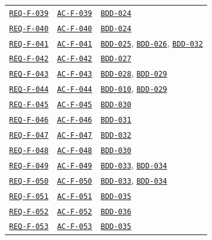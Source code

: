 \documentclass[11pt,a4paper]{article}
\begin{document}
\begin{longtable}{p{3.1cm} p{3.0cm} >{\raggedright\arraybackslash}p{9.1cm}}
\hyperlink{REQ-F-039}{\texttt{REQ-F-039}} & \hyperlink{AC-F-039}{\texttt{AC-F-039}} & \hyperlink{BDD-024}{\texttt{BDD-024}} \\
\hyperlink{REQ-F-040}{\texttt{REQ-F-040}} & \hyperlink{AC-F-040}{\texttt{AC-F-040}} & \hyperlink{BDD-024}{\texttt{BDD-024}} \\
\hyperlink{REQ-F-041}{\texttt{REQ-F-041}} & \hyperlink{AC-F-041}{\texttt{AC-F-041}} & \hyperlink{BDD-025}{\texttt{BDD-025}}, \hyperlink{BDD-026}{\texttt{BDD-026}}, \hyperlink{BDD-032}{\texttt{BDD-032}} \\
\hyperlink{REQ-F-042}{\texttt{REQ-F-042}} & \hyperlink{AC-F-042}{\texttt{AC-F-042}} & \hyperlink{BDD-027}{\texttt{BDD-027}} \\
\hyperlink{REQ-F-043}{\texttt{REQ-F-043}} & \hyperlink{AC-F-043}{\texttt{AC-F-043}} & \hyperlink{BDD-028}{\texttt{BDD-028}}, \hyperlink{BDD-029}{\texttt{BDD-029}} \\
\hyperlink{REQ-F-044}{\texttt{REQ-F-044}} & \hyperlink{AC-F-044}{\texttt{AC-F-044}} & \hyperlink{BDD-010}{\texttt{BDD-010}}, \hyperlink{BDD-029}{\texttt{BDD-029}} \\
\hyperlink{REQ-F-045}{\texttt{REQ-F-045}} & \hyperlink{AC-F-045}{\texttt{AC-F-045}} & \hyperlink{BDD-030}{\texttt{BDD-030}} \\
\hyperlink{REQ-F-046}{\texttt{REQ-F-046}} & \hyperlink{AC-F-046}{\texttt{AC-F-046}} & \hyperlink{BDD-031}{\texttt{BDD-031}} \\
\hyperlink{REQ-F-047}{\texttt{REQ-F-047}} & \hyperlink{AC-F-047}{\texttt{AC-F-047}} & \hyperlink{BDD-032}{\texttt{BDD-032}} \\
\hyperlink{REQ-F-048}{\texttt{REQ-F-048}} & \hyperlink{AC-F-048}{\texttt{AC-F-048}} & \hyperlink{BDD-030}{\texttt{BDD-030}} \\
\hyperlink{REQ-F-049}{\texttt{REQ-F-049}} & \hyperlink{AC-F-049}{\texttt{AC-F-049}} & \hyperlink{BDD-033}{\texttt{BDD-033}}, \hyperlink{BDD-034}{\texttt{BDD-034}} \\
\hyperlink{REQ-F-050}{\texttt{REQ-F-050}} & \hyperlink{AC-F-050}{\texttt{AC-F-050}} & \hyperlink{BDD-033}{\texttt{BDD-033}}, \hyperlink{BDD-034}{\texttt{BDD-034}} \\
\hyperlink{REQ-F-051}{\texttt{REQ-F-051}} & \hyperlink{AC-F-051}{\texttt{AC-F-051}} & \hyperlink{BDD-035}{\texttt{BDD-035}} \\
\hyperlink{REQ-F-052}{\texttt{REQ-F-052}} & \hyperlink{AC-F-052}{\texttt{AC-F-052}} & \hyperlink{BDD-036}{\texttt{BDD-036}} \\
\hyperlink{REQ-F-053}{\texttt{REQ-F-053}} & \hyperlink{AC-F-053}{\texttt{AC-F-053}} & \hyperlink{BDD-035}{\texttt{BDD-035}} \\

\end{longtable}
\end{document}
